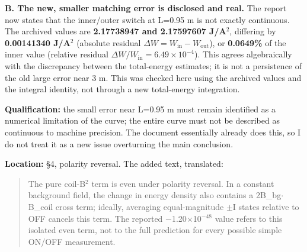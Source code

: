 \documentclass[10pt,a4paper]{article}
\begin{document}
{\newpage
{}\par\vspace{2pt}
\noindent{\color{navy}\rule{\linewidth}{0.4pt}}\par\vspace{2pt}
\textbf{B. The new, smaller matching error is disclosed and real.} The report now states that the inner/outer switch at L=0.95 m is not exactly continuous. The archived values are \textbf{2.17738947 and 2.17597607 J/A$^2$}, differing by \textbf{0.00141340 J/A$^2$} (absolute residual $\Delta W = W_{\text{in}} - W_{\text{out}}$), or \textbf{0.0649\%} of the inner value (relative residual $\Delta W/W_{\text{in}} = 6.49\times 10^{-4}$). This agrees algebraically with the discrepancy between the total-energy estimates; it is not a persistence of the old large error near 3 m. This was checked here using the archived values and the integral identity, not through a new total-energy integration.
\par
\textbf{Qualification:} the small error near L=0.95 m must remain identified as a numerical limitation of the curve; the entire curve must not be described as continuous to machine precision. The document essentially already does this, so I do not treat it as a new issue overturning the main conclusion.
\par
\vspace{2pt}\par\vspace{0.5pt}
\par
\textbf{Location:} \S4, polarity reversal. The added text, translated:
\par
\begin{quote}\vspace{-3pt}
The pure coil-B$^2$ term is even under polarity reversal. In a constant background field, the change in energy density also contains a 2B\_bg$\cdot$B\_coil cross term; ideally, averaging equal-magnitude $\pm$I states relative to OFF cancels this term. The reported $-$1.20$\times$10$^{-48}$ value refers to this isolated even term, not to the full prediction for every possible simple ON/OFF measurement.


\end{quote}}
\end{document}
